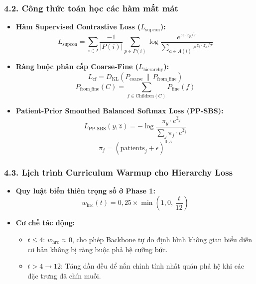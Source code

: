 \documentclass[
  11pt,
  a4paper,
]{article}
\providecommand{\tightlist}{%
  \setlength{\itemsep}{0pt}\setlength{\parskip}{0pt}}
\begin{document}
\subsubsection{4.2. Công thức toán học các hàm mất
mát}\label{cuxf4ng-thux1ee9c-touxe1n-hux1ecdc-cuxe1c-huxe0m-mux1ea5t-muxe1t}

\begin{itemize}
\tightlist
\item
  \textbf{Hàm Supervised Contrastive Loss (\(L_{\text{supcon}}\)):}
  \[L_{\text{supcon}} = \sum_{i \in I} \frac{-1}{|P(i)|} \sum_{p \in P(i)} \log \frac{e^{z_i \cdot z_p / \tau}}{\sum_{a \in A(i)} e^{z_i \cdot z_a / \tau}}\]
\item
  \textbf{Ràng buộc phân cấp Coarse-Fine (\(L_{\text{hierarchy}}\)):}
  \[L_{\text{cf}} = D_{\text{KL}}\left(P_{\text{coarse}} \,\parallel\, P_{\text{from\_fine}}\right)\]
  \[P_{\text{from\_fine}}(C) = \sum_{f \in \text{Children}(C)} P_{\text{fine}}(f)\]
\item
  \textbf{Patient-Prior Smoothed Balanced Softmax Loss (PP-SBS):}
  \[L_{\text{PP-SBS}}(y, \hat{z}) = -\log \frac{\pi_y \cdot e^{\hat{z}_y}}{\sum_{j} \pi_j \cdot e^{\hat{z}_j}}\]
  \[\pi_j = (\text{patients}_j + \epsilon)^{0{,}5}\]
\end{itemize}

\subsubsection{4.3. Lịch trình Curriculum Warmup cho Hierarchy
Loss}\label{lux1ecbch-truxecnh-curriculum-warmup-cho-hierarchy-loss}

\begin{itemize}
\tightlist
\item
  \textbf{Quy luật biến thiên trọng số ở Phase 1:}
  \[w_{\text{hrc}}(t) = 0{,}25 \times \min\left(1{,}0,\, \frac{t}{12}\right)\]
\item
  \textbf{Cơ chế tác động:}

  \begin{itemize}
  \tightlist
  \item
    \(t \le 4\): \(w_{\text{hrc}} \approx 0\), cho phép Backbone tự do
    định hình không gian biểu diễn cơ bản không bị ràng buộc phả hệ
    cưỡng bức.
  \item
    \(t > 4 \rightarrow 12\): Tăng dần đều để nắn chỉnh tính nhất quán
    phả hệ khi các đặc trưng đã chín muồi.
  \end{itemize}
\end{itemize}
\end{document}
